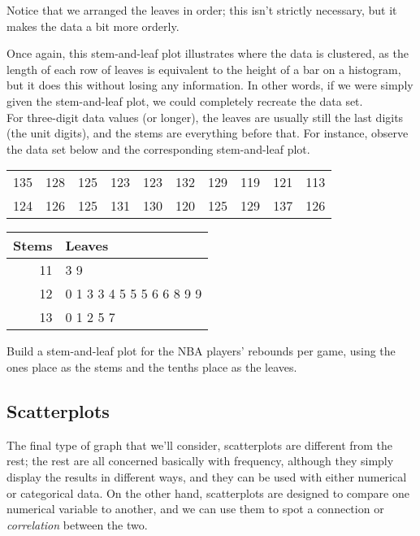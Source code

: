 Notice that we arranged the leaves in order; this isn't strictly necessary, but it makes the data a bit more orderly.

Once again, this stem-and-leaf plot illustrates where the data is clustered, as the length of each row of leaves is equivalent to the height of a bar on a histogram, but it does this without losing any information.  In other words, if we were simply given the stem-and-leaf plot, we could completely recreate the data set.\\

For three-digit data values (or longer), the leaves are usually still the last digits (the unit digits), and the stems are everything before that.  For instance, observe the data set below and the corresponding stem-and-leaf plot.

\begin{center}
\begin{tabular}{c c c c c c c c c c}
135 & 128 & 125 & 123 & 123 & 132 & 129 & 119 & 121 & 113\\
124 & 126 & 125 & 131 & 130 & 120 & 125 & 129 & 137 & 126\\
\end{tabular}
\end{center}

\begin{center}
\begin{tabular}{r | l}
Stems & Leaves\\
\hline
11 & 3 9\\
12 & 0 1 3 3 4 5 5 5 6 6 8 9 9\\
13 & 0 1 2 5 7
\end{tabular}
\end{center}

\begin{try}
Build a stem-and-leaf plot for the NBA players' rebounds per game, using the ones place as the stems and the tenths place as the leaves.
\end{try}
\vfill
\pagebreak

\subsection{Scatterplots}
The final type of graph that we'll consider, scatterplots are different from the rest; the rest are all concerned basically with frequency, although they simply display the results in different ways, and they can be used with either numerical or categorical data.  On the other hand, scatterplots are designed to compare one numerical variable to another, and we can use them to spot a connection or \emph{correlation} between the two.

